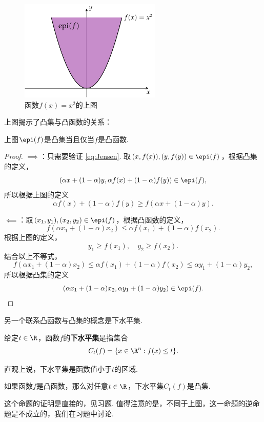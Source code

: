 \begin{figure}[ht]
    \centering
    \includegraphics[width=0.6\textwidth]{Figures/convex-anlaysis/epigraph.pdf}
    \caption{函数$f(x)=x^2$的上图}
    \label{fig:epigraph}
\end{figure}

上图揭示了凸集与凸函数的关系：
\begin{theorem}\label{thm:convex-epi}
    上图$\epi(f)$是凸集当且仅当$f$是凸函数.
\end{theorem}

\begin{proof}
$\implies$：只需要验证 \eqref{eq:Jensen}. 取$(x,f(x)),(y,f(y))\in\epi(f)$，根据凸集的定义，
\[(\alpha x+(1-\alpha)y,\alpha f(x)+(1-\alpha)f(y))\in\epi(f),\]
所以根据上图的定义
\[\alpha f(x)+(1-\alpha)f(y)\geq f(\alpha x+(1-\alpha)y).\]

$\impliedby$：取$(x_1,y_1),(x_2,y_2)\in\epi(f)$，根据凸函数的定义，
\[f(\alpha x_1+(1-\alpha) x_2)\leq\alpha f(x_1)+(1-\alpha)f(x_2).\]
根据上图的定义，
\[y_1\geq f(x_1),\quad y_2\geq f(x_2).\]
结合以上不等式，
\[f(\alpha x_1+(1-\alpha) x_2)\leq\alpha f(x_1)+(1-\alpha)f(x_2)\leq\alpha y_1+(1-\alpha) y_2,\]
所以根据凸集的定义
\[(\alpha x_1+(1-\alpha) x_2,\alpha y_1+(1-\alpha) y_2)\in\epi(f).\]
\end{proof}

另一个联系凸函数与凸集的概念是下水平集. 
\begin{definition}[下水平集]
    给定$t\in\R$，函数$f$的\textbf{下水平集}是指集合
    \[C_t(f)=\{x\in\R^n:f(x)\leq t\}.\]
\end{definition}
直观上说，下水平集是函数值小于$t$的区域.

\begin{proposition}\label{prop:level-set}
    如果函数$f$是凸函数，那么对任意$t\in\R$，下水平集$C_t(f)$是凸集.
\end{proposition}
这个命题的证明是直接的，见习题. 值得注意的是，不同于上图，这一命题的逆命题是不成立的，我们在习题中讨论. 

